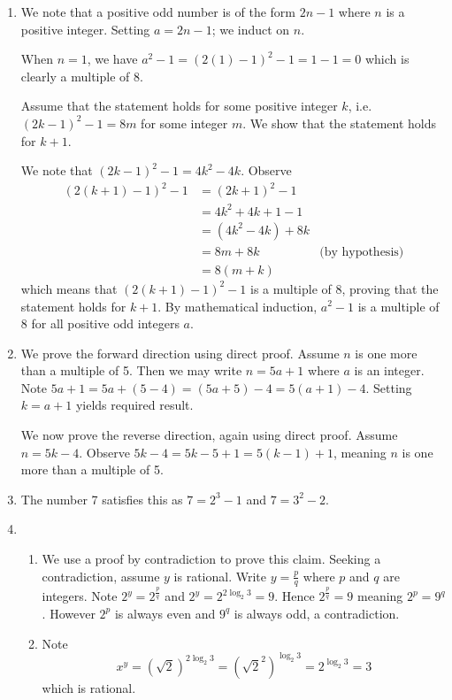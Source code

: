 \begin{enumerate}
    \item We note that a positive odd number is of the form $2n - 1$ where $n$ is a positive integer. Setting $a = 2n - 1$; we induct on $n$.
    
    When $n = 1$, we have $a^2 - 1 = (2(1) - 1)^2 - 1 = 1 - 1 = 0$ which is clearly a multiple of 8.
    
    Assume that the statement holds for some positive integer $k$, i.e. $(2k-1)^2 - 1 = 8m$ for some integer $m$. We show that the statement holds for $k + 1$.
    
    We note that $(2k-1)^2 - 1 = 4k^2 - 4k$. Observe
    \begin{align*}
        (2(k+1)-1)^2 - 1 &= (2k+1)^2 - 1\\
        &= 4k^2 + 4k + 1 - 1\\
        &= (4k^2 - 4k) + 8k\\
        &= 8m + 8k & \text{(by hypothesis)}\\
        &= 8(m+k)
    \end{align*}
    which means that $(2(k+1)-1)^2 - 1$ is a multiple of 8, proving that the statement holds for $k+1$. By mathematical induction, $a^2 - 1$ is a multiple of 8 for all positive odd integers $a$.
    
    \item We prove the forward direction using direct proof. Assume $n$ is one more than a multiple of 5. Then we may write $n = 5a + 1$ where $a$ is an integer. Note $5a + 1 = 5a + (5 - 4) = (5a + 5) - 4 = 5(a+1) - 4$. Setting $k = a+1$ yields required result.
    
    We now prove the reverse direction, again using direct proof. Assume $n = 5k - 4$. Observe $5k - 4 = 5k - 5 + 1 = 5(k-1) + 1$, meaning $n$ is one more than a multiple of 5.
    
    \item The number 7 satisfies this as $7 = 2^3 - 1$ and $7 = 3^2 - 2$.
    
    \item \begin{enumerate}[label=(\roman*)]
        \item We use a proof by contradiction to prove this claim. Seeking a contradiction, assume $y$ is rational. Write $y = \frac pq$ where $p$ and $q$ are integers. Note $2^y = 2^{\frac pq}$ and $2^y = 2^{2\log_2{3}} = 9$. Hence $2^{\frac pq} = 9$ meaning $2^p = 9^q$. However $2^p$ is always even and $9^q$ is always odd, a contradiction.
        \item Note
        \[
            x^y = (\sqrt2)^{2\log_2{3}} = \left(\sqrt{2}^2\right)^{\log_2{3}} = 2^{\log_2{3}} = 3        
        \]
        which is rational.
    \end{enumerate}
\end{enumerate}

